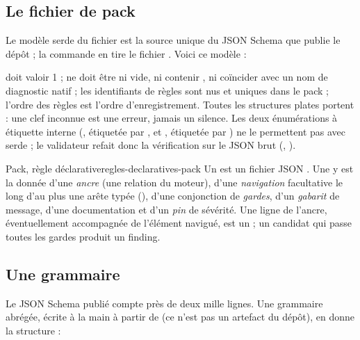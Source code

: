 \subsection{Le fichier de pack}

Le modèle serde du fichier est la source unique du JSON Schema que publie le dépôt ; la commande  en tire le fichier . Voici ce modèle :


 doit valoir 1 ;  ne doit être ni vide, ni contenir \code{/}, ni coïncider avec un nom de diagnostic natif ; les identifiants de règles sont nus et uniques dans le pack ; l'ordre des règles est l'ordre d'enregistrement. Toutes les structures \og plates\fg{} portent  : une clef inconnue est une erreur, jamais un silence. Les deux énumérations à étiquette interne (, étiquetée par , et , étiquetée par ) ne le permettent pas avec serde ; le validateur refait donc la vérification sur le JSON brut (, ).

\begin{definition}{Pack, règle déclarative}{regles-declaratives-pack}
Un  est un fichier JSON . Une  y est la donnée d'une \emph{ancre} (une relation du moteur), d'une \emph{navigation} facultative le long d'au plus une arête typée (), d'une conjonction de \emph{gardes}, d'un \emph{gabarit} de message, d'une documentation et d'un \emph{pin} de sévérité. Une ligne de l'ancre, éventuellement accompagnée de l'élément navigué, est un  ; un candidat qui passe toutes les gardes produit un finding.
\end{definition}

\subsection{Une grammaire}

Le JSON Schema publié compte près de deux mille lignes. Une grammaire abrégée, écrite à la main à partir de  (ce n'est pas un artefact du dépôt), en donne la structure :

